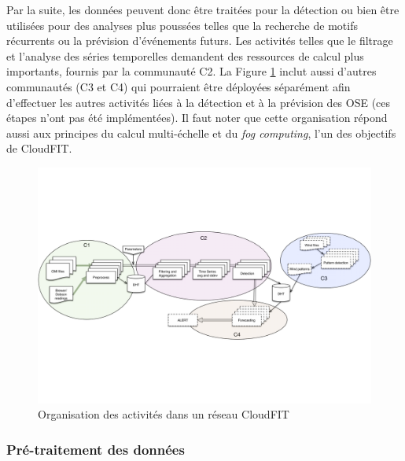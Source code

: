 Par la suite, les données peuvent donc être traitées pour la détection ou bien être utilisées pour des analyses plus poussées telles que la recherche de motifs récurrents ou la prévision d'événements futurs. Les activités telles que le filtrage et l'analyse des séries temporelles demandent des ressources de calcul plus importants, fournis par la communauté C2.
La Figure \ref{fig:blocs} inclut aussi d'autres communautés (C3 et C4) qui pourraient être déployées séparément afin d'effectuer les autres activités liées à la détection et à la prévision des OSE (ces étapes n'ont pas été implémentées). Il faut noter que cette organisation répond aussi aux principes du calcul multi-échelle et du \textit{fog computing}, l'un des objectifs de CloudFIT.

\begin{figure}
	\centering
	\includegraphics[width=1\linewidth]{img/4-process}
	\caption{Organisation des activités dans un réseau CloudFIT}\label{fig:blocs}
\end{figure}

\subsubsection{Pré-traitement des données}

